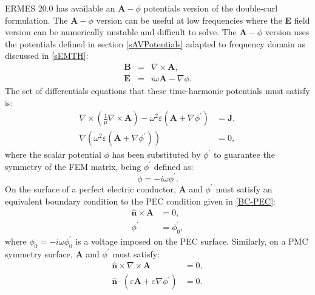 ERMES 20.0 has available an $\textbf{A}-\phi$ potentials version of the double-curl formulation. The $\textbf{A}-\phi$ version can be useful at low frequencies where the \textbf{E} field version can be numerically unstable and difficult to solve. The $\textbf{A}-\phi$ version uses the potentials defined in section \ref{sAVPotentials} adapted to frequency domain as discussed in \ref{sEMTH}:
\begin{eqnarray}\label{DefPotentialsFD} 
	\mathbf{B} &=& \nabla\times\mathbf{A}, 
	\label{DefBPotentialsFD}
	\\
	\mathbf{E} &=& i\omega\mathbf{A} - \nabla\phi.
	\label{DefEPotentialsFD}
\end{eqnarray}
The set of differentials equations that these time-harmonic potentials must satisfy is:
\begin{equation}\label{CCAVDE}
	\begin{aligned}
		\nabla\times\left(\frac{1}{\mu}\nabla\times\mathbf{A}\right) - \omega^{2}\varepsilon\left(\mathbf{A} + \nabla\phi^{'}\right) &= \mathbf{J},
		\\
		\nabla\left(\omega^{2}\varepsilon\left(\mathbf{A} + \nabla\phi^{'}\right)\right) &= 0,
	\end{aligned}
\end{equation}
where the scalar potential $\phi$ has been substituted by $\phi^{'}$ to guarantee the symmetry of the FEM matrix, being $\phi^{'}$ defined as:
\begin{equation}\label{PhiReDef}
	\phi = -i\omega\phi^{'}.
\end{equation}
On the surface of a perfect electric conductor, $\textbf{A}$ and $\phi^{'}$ must satisfy an equivalent boundary condition to the PEC condition given in \ref{BC-PEC}:
\begin{equation}\label{PEC-AV-CC}
	\begin{aligned}
		\mathbf{\hat{n}}\times\mathbf{A} &= 0,
		\\
		\phi^{'} &= \phi^{'}_{0},
	\end{aligned}
\end{equation}
where $\phi_{0} = -i\omega\phi^{'}_{0}$ is a voltage imposed on the PEC surface. Similarly, on a PMC symmetry surface, $\textbf{A}$ and $\phi^{'}$ must satisfy:
\begin{equation}\label{PMC-AV-CC}
	\begin{aligned}
		\mathbf{\hat{n}}\times\nabla\times\mathbf{A} &= 0,
		\\
		\mathbf{\hat{n}}\cdot\left(\varepsilon\mathbf{A} + \varepsilon\nabla\phi^{'}\right) &= 0.
	\end{aligned}
\end{equation}

